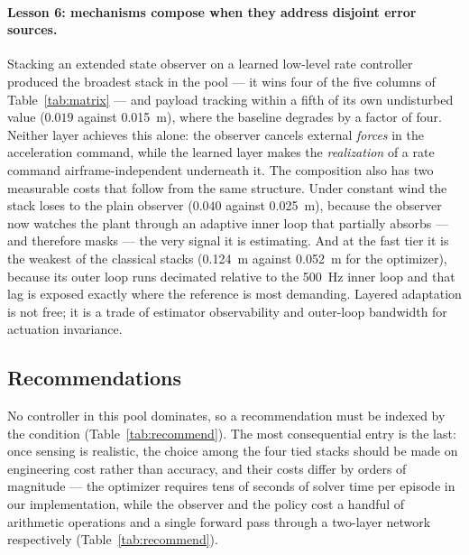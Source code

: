 \paragraph{Lesson 6: mechanisms compose when they address disjoint error sources.}
Stacking an extended state observer on a learned low-level rate controller produced the
broadest stack in the pool --- it wins four of the five columns of
Table~\ref{tab:matrix} --- and payload tracking within a fifth of its own undisturbed
value ($0.019$ against \SI{0.015}{\meter}), where the baseline degrades by a factor of
four. Neither layer achieves this alone: the observer cancels external \emph{forces} in
the acceleration command, while the learned layer makes the \emph{realization} of a rate
command airframe-independent underneath it. The composition also has two measurable costs
that follow from the same structure. Under constant wind the stack loses to the plain
observer ($0.040$ against \SI{0.025}{\meter}), because the observer now watches the plant
through an adaptive inner loop that partially absorbs --- and therefore masks --- the very
signal it is estimating. And at the fast tier it is the weakest of the classical stacks
(\SI{0.124}{\meter} against \SI{0.052}{\meter} for the optimizer), because its outer loop
runs decimated relative to the \SI{500}{\hertz} inner loop and that lag is exposed exactly
where the reference is most demanding. Layered adaptation is not free; it is a trade of
estimator observability and outer-loop bandwidth for actuation invariance.

\subsection{Recommendations}
\label{sec:results:recommendations}

No controller in this pool dominates, so a recommendation must be indexed by the
condition (Table~\ref{tab:recommend}). The most consequential entry is the last: once
sensing is realistic, the choice among the four tied stacks should be made on
engineering cost rather than accuracy, and their costs differ by orders of magnitude ---
the optimizer requires tens of seconds of solver time per episode in our implementation,
while the observer and the policy cost a handful of arithmetic operations and a single
forward pass through a two-layer network respectively (Table~\ref{tab:recommend}).


